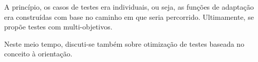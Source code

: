 A princípio, os casos de testes era individuais, ou seja, as funções de
adaptação era construídas com base no caminho em que seria percorrido.
Ultimamente, se propõe testes com multi-objetivos. 

Neste meio tempo, discuti-se também sobre otimização de testes baseada no
conceito à orientação. 









